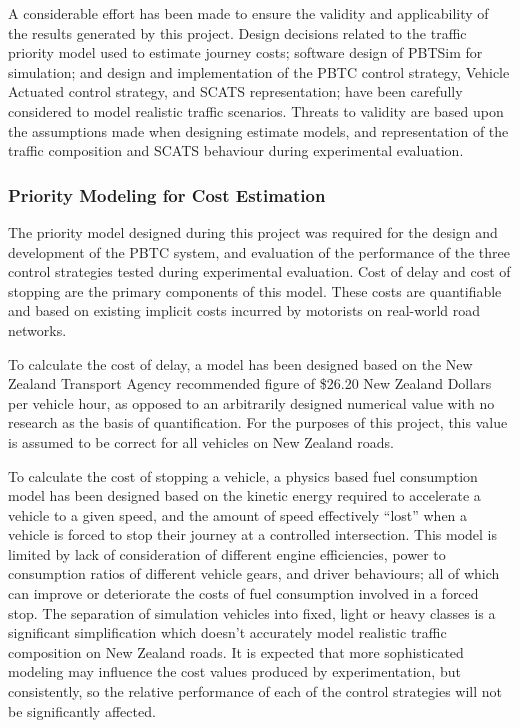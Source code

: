 A considerable effort has been made to ensure the validity and applicability of the results generated by this project. Design decisions related to the traffic priority model used to estimate journey costs; software design of PBTSim for simulation; and design and implementation of the PBTC control strategy, Vehicle Actuated control strategy, and SCATS representation; have been carefully considered to model realistic traffic scenarios. Threats to validity are based upon the assumptions made when designing estimate models, and representation of the traffic composition and SCATS behaviour during experimental evaluation.

\subsubsection{Priority Modeling for Cost Estimation}

The priority model designed during this project was required for the design and development of the PBTC system, and evaluation of the performance of the three control strategies tested during experimental evaluation. Cost of delay and cost of stopping are the primary components of this model. These costs are quantifiable and based on existing implicit costs incurred by motorists on real-world road networks. 

To calculate the cost of delay, a model has been designed based on the New Zealand Transport Agency recommended figure of \$26.20 New Zealand Dollars per vehicle hour, as opposed to an arbitrarily designed numerical value with no research as the basis of quantification. For the purposes of this project, this value is assumed to be correct for all vehicles on New Zealand roads. 

To calculate the cost of stopping a vehicle, a physics based fuel consumption model has been designed based on the kinetic energy required to accelerate a vehicle to a given speed, and the amount of speed effectively ``lost'' when a vehicle is forced to stop their journey at a controlled intersection. This model is limited by lack of consideration of different engine efficiencies, power to consumption ratios of different vehicle gears, and driver behaviours; all of which can improve or deteriorate the costs of fuel consumption involved in a forced stop. The separation of simulation vehicles into fixed, light or heavy classes is a significant simplification which doesn't accurately model realistic traffic composition on New Zealand roads. It is expected that more sophisticated modeling may influence the cost values produced by experimentation, but consistently, so the relative performance of each of the control strategies will not be significantly affected.

